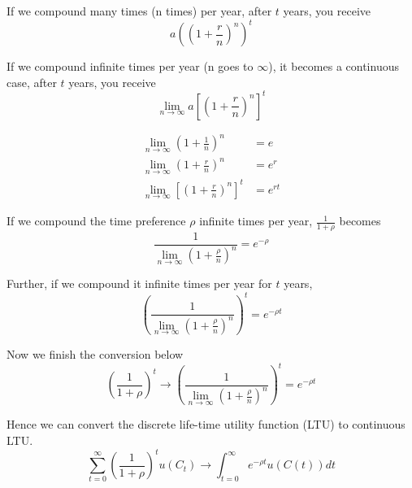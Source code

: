 \documentclass[12pt]{article}
\begin{document}
If we compound many times (n times) per year, after $ t $ years, you receive
\begin{equation*}
a \left( (1 + \frac{r}{n})^{n} \right) ^{t}
\end{equation*}

If we compound infinite times per year (n goes to $ \infty  $), it becomes a continuous
case, after $ t $ years, you receive
\begin{equation*}
\lim_{n \to \infty} a \left[  \left( 1 + \frac{r}{n} \right)^{n}  \right] ^{t}
\end{equation*}


\begin{align*}
\lim_{n \to \infty} \left( 1 + \frac{1}{n} \right) ^{n} &= e\\
\lim_{n \to \infty} \left( 1 + \frac{r}{n} \right) ^{n} &= e^{r}\\
\lim_{n \to \infty} \left[ \left( 1 + \frac{r}{n} \right)^{n}  \right] ^{t}&= e^{r t}
\end{align*}

If we compound the time preference $ \rho $ infinite times per year,
$ \frac{1}{1 + \rho} $
becomes
\begin{equation*}
 \frac{1}{ \lim_{n \to \infty}\left( 1 + \frac{\rho}{n} \right) ^{n}} = e^{-\rho}
\end{equation*}

Further, if we compound it infinite times per year for $ t $ years,
\begin{equation*}
\left(  \frac{1}{ \lim_{n \to \infty}\left( 1 + \frac{\rho}{n} \right) ^{n}}  \right) 
^{t} = e^{ - \rho t}
\end{equation*}

Now we finish the conversion below
\begin{equation*}
 \left( \frac{1}{1 + \rho} \right) ^{t}	
\rightarrow 
\left(  \frac{1}{ \lim_{n \to \infty}\left( 1 + \frac{\rho}{n} \right) ^{n}}  \right) 
^{t} = e^{ - \rho t}
\end{equation*}


Hence we can convert the discrete life-time utility function (LTU) to continuous LTU.
\begin{equation*}
\sum\limits_{t = 0} ^\infty \left( \frac{1}{1 + \rho} \right) ^{t} u(C_{t})
\rightarrow
\int_{t = 0}^{\infty } e^{ - \rho t}u(C(t))dt
\end{equation*}














%
%
\end{document}
